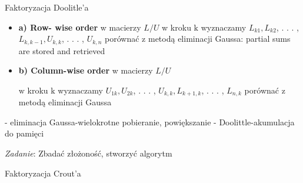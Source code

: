 \begin{frame}{Faktoryzacja Doolitle'a}
\begin{itemize}
\item \textbf{ a) Row- wise order } w macierzy $L/U$
w kroku $\mathrm{k}$ wyznaczamy $L_{k1}, L_{k2}$, . . . , $L_{k,k-1}, U_{k,k}$, . . . , $U_{k,n}$ porównać z metodą eliminacji Gaussa: partial sums are stored and retrieved
\item \textbf{b) Column-wise order}  w macierzy $L/U$

$\mathrm{w}$ kroku $\mathrm{k}$ wyznaczamy $U_{1k}, U_{2k}$, . . . , $U_{k,k}, L_{k+1,k}$, . . . , $L_{n,k}$ porównać z metodą eliminacji Gaussa
\end{itemize}


- eliminacja Gaussa-wielokrotne pobieranie, powiększanie \newline - Doolittle-akumulacja do pamięci

\begin{flushright}
{\it Zadanie}: Zbadać złożoność, stworzyć algorytm
\end{flushright} 

\end{frame}
\begin{frame}{ Faktoryzacja Crout'a}

\end{frame}
